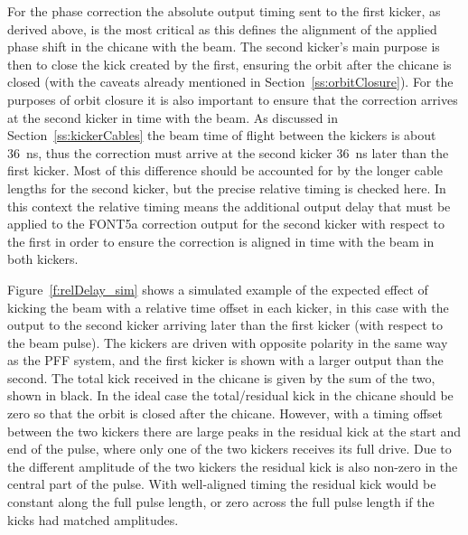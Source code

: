 For the phase correction the absolute output timing sent to the first kicker, as derived above, is the most critical as this defines the alignment of the applied phase shift in the chicane with the beam. The second kicker's main purpose is then to close the kick created by the first, ensuring the orbit after the chicane is closed (with the caveats already mentioned in Section~\ref{ss:orbitClosure}). For the purposes of orbit closure it is also important to ensure that the correction arrives at the second kicker in time with the beam. As discussed in Section~\ref{ss:kickerCables} the beam time of flight between the kickers is about 36~ns, thus the correction must arrive at the second kicker 36~ns later than the first kicker. Most of this difference should be accounted for by the longer cable lengths for the second kicker, but the precise relative timing is checked here. In this context the relative timing means the additional output delay that must be applied to the FONT5a correction output for the second kicker with respect to the first in order to ensure the correction is aligned in time with the beam in both kickers.

Figure~\ref{f:relDelay_sim} shows a simulated example of the expected effect of kicking the beam with a relative time offset in each kicker, in this case with the output to the second kicker arriving later than the first kicker (with respect to the beam pulse). The kickers are driven with opposite polarity in the same way as the PFF system, and the first kicker is shown with a larger output than the second. The total kick received in the chicane is given by the sum of the two, shown in black. In the ideal case the total/residual kick in the chicane should be zero so that the orbit is closed after the chicane. However, with a timing offset between the two kickers there are large peaks in the residual kick at the start and end of the pulse, where only one of the two kickers receives its full drive. Due to the different amplitude of the two kickers the residual kick is also non-zero in the central part of the pulse. With well-aligned timing the residual kick would be constant along the full pulse length, or zero across the full pulse length if the kicks had matched amplitudes.

